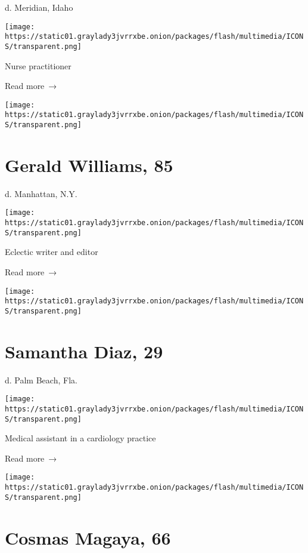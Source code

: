 d. Meridian, Idaho

\texttt{[image: https://static01.graylady3jvrrxbe.onion/packages/flash/multimedia/ICONS/transparent.png]}

Nurse practitioner

 Read more~→

\href{https://www.nytimes3xbfgragh.onion/2020/07/23/obituaries/gerald-williams-dead-coronavirus.html}{}

\texttt{[image: https://static01.graylady3jvrrxbe.onion/packages/flash/multimedia/ICONS/transparent.png]}

\hypertarget{gerald-williams-85}{%
\section{Gerald Williams, 85}\label{gerald-williams-85}}

d. Manhattan, N.Y.

\texttt{[image: https://static01.graylady3jvrrxbe.onion/packages/flash/multimedia/ICONS/transparent.png]}

Eclectic writer and editor

 Read more~→

\href{https://www.nytimes3xbfgragh.onion/2020/07/22/obituaries/samantha-diaz-dead-coronavirus.html}{}

\texttt{[image: https://static01.graylady3jvrrxbe.onion/packages/flash/multimedia/ICONS/transparent.png]}

\hypertarget{samantha-diaz-29}{%
\section{Samantha Diaz, 29}\label{samantha-diaz-29}}

d. Palm Beach, Fla.

\texttt{[image: https://static01.graylady3jvrrxbe.onion/packages/flash/multimedia/ICONS/transparent.png]}

Medical assistant in a cardiology practice

 Read more~→

\href{https://www.nytimes3xbfgragh.onion/2020/07/21/obituaries/cosmas-magaya-dead-coronavirus.html}{}

\texttt{[image: https://static01.graylady3jvrrxbe.onion/packages/flash/multimedia/ICONS/transparent.png]}

\hypertarget{cosmas-magaya-66}{%
\section{Cosmas Magaya, 66}\label{cosmas-magaya-66}}

